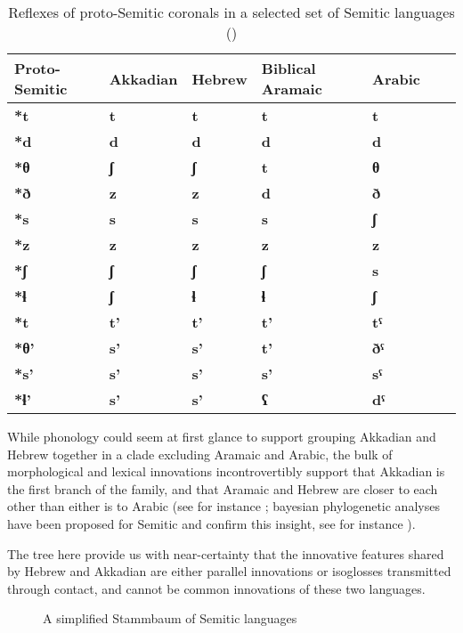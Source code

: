 \documentclass[svgnames,12pt]{scrartcl}
\newcommand{\ipa}[1]{\textbf{{\phon\mbox{#1}}}}
\newcommand{\grise}[1]{\cellcolor{lightgray}\textbf{#1}}
\begin{document}
\begin{table}[h]
\caption{Reflexes of proto-Semitic coronals in a selected set of Semitic languages (\citealt{huehnergard97})} \label{tab:protosem} \centering
\begin{tabular}{lllllll}
\toprule
Proto-Semitic & Akkadian & Hebrew & Biblical Aramaic & Arabic \\
\midrule
\ipa{*t} & \ipa{t} & \ipa{t} & \ipa{t} & \ipa{t} \\
\ipa{*d} & \ipa{d} & \ipa{d} & \ipa{d} & \ipa{d} \\
\ipa{*θ} & \ipa{ʃ} \grise{}& \ipa{ʃ} \grise{}& \ipa{t} & \ipa{θ} \\
\ipa{*ð} & \ipa{z} \grise{}& \ipa{z} \grise{}& \ipa{d} & \ipa{ð} \\
\ipa{*s} & \ipa{s} & \ipa{s} & \ipa{s} & \ipa{ʃ} &\\
\ipa{*z} & \ipa{z} & \ipa{z} & \ipa{z} & \ipa{z} \\
\ipa{*ʃ} & \ipa{ʃ} & \ipa{ʃ} & \ipa{ʃ} & \ipa{s} &\\
\ipa{*ɬ} & \ipa{ʃ} \grise{}& \ipa{ɬ} & \ipa{ɬ} &  \ipa{ʃ} \grise{}\\
\ipa{*t} & \ipa{t'} & \ipa{t'} & \ipa{t'} & \ipa{tˤ} \\
\ipa{*θ'} & \ipa{s'} \grise{}& \ipa{s'} \grise{}& \ipa{t'} & \ipa{ðˤ} \\
\ipa{*s'} & \ipa{s'}  & \ipa{s'} & \ipa{s'} & \ipa{sˤ} &\\
\ipa{*ɬ'} & \ipa{s'} \grise{}& \ipa{s'} \grise{}& \ipa{ʕ} &  \ipa{dˤ} \\
\bottomrule
\end{tabular}
\end{table}

While phonology could seem at first glance to support grouping Akkadian and Hebrew together in a clade excluding Aramaic and Arabic, the bulk of morphological and lexical innovations incontrovertibly support that Akkadian is the first branch of the family, and that Aramaic and Hebrew are closer to each other than either is to Arabic  (see for instance \citealt{hetzron76two}; bayesian phylogenetic analyses have been proposed for Semitic and confirm this insight, see for instance \citealt{nicholls11semitic}). 

The tree here provide us with near-certainty that the innovative features shared by Hebrew and Akkadian are either parallel innovations or isoglosses transmitted through contact, and cannot be common innovations of these two languages.

   \begin{figure}[h]
   \caption{A simplified Stammbaum of Semitic languages} \label{fig:semitic}   \centering
\end{figure}
\end{document}
